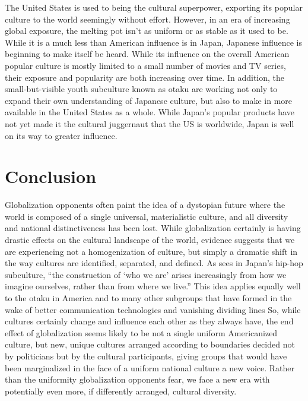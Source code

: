 \documentclass[12pt]{article}
\begin{document}
The United States is used to being the cultural superpower, exporting its popular culture to the world seemingly without effort.  However, in an era of increasing global exposure, the melting pot isn't as uniform or as stable as it used to be.  While it is a much less than American influence is in Japan, Japanese influence is beginning to make itself be heard.  While its influence on the overall American popular culture is mostly limited to a small number of movies and TV series, their exposure and popularity are both increasing over time.  In addition, the small-but-visible youth subculture known as otaku are working not only to expand their own understanding of Japanese culture, but also to make in more available in the United States as a whole.  While Japan's popular products have not yet made it the cultural juggernaut that the US is worldwide, Japan is well on its way to greater influence.

\section{Conclusion}

Globalization opponents often paint the idea of a dystopian future where the world is composed of a single universal, materialistic culture, and all diversity and national distinctiveness has been lost.  While globalization certainly is having drastic effects on the cultural landscape of the world, evidence suggests that we are experiencing not a homogenization of culture, but simply a dramatic shift in the way cultures are identified, separated, and defined.
As \cHopGlob{\citet[pg.\ 384]} sees in Japan's hip-hop subculture, ``the construction of `who we are' arises increasingly from how we imagine ourselves, rather than from where we live.''
This idea applies equally well to the otaku in America and to many other subgroups that have formed in the wake of better communication technologies and vanishing dividing lines
So, while cultures certainly change and influence each other as they always have, the end effect of globalization seems likely to be not a single uniform Americanized culture, but new, unique cultures arranged according to boundaries decided not by politicians but by the cultural participants, giving groups that would have been marginalized in the face of a uniform national culture a new voice. Rather than the uniformity globalization opponents fear, we face a new era with potentially even more, if differently arranged, cultural diversity.
\end{document}
